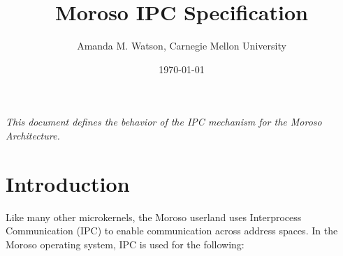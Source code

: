 \documentclass{article}
\title{Moroso IPC Specification} %
\author{Amanda M. Watson, Carnegie Mellon University}
\date{\today} %
\begin{document}
\maketitle %





\emph{This document defines the behavior of the IPC mechanism for the Moroso Architecture.}

\section{Introduction}
Like many other microkernels, the Moroso userland uses Interprocess Communication (IPC) to enable communication across address spaces.  In the Moroso operating system, IPC is used for the following:
\end{document}
